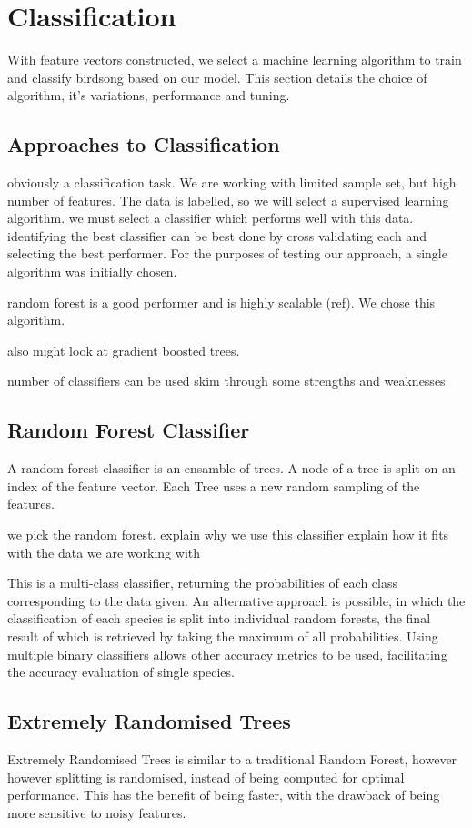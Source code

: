 \section{Classification}
With feature vectors constructed, we select a machine learning algorithm to
train and classify birdsong based on our model.
This section details the choice of algorithm, it's variations, performance and
tuning.

\subsection{Approaches to Classification}
obviously a classification task.
We are working with limited sample set, but high number of features.
The data is labelled, so we will select a supervised learning algorithm.
we must select a classifier which performs well with this data.
identifying the best classifier can be best done by cross validating each and
selecting the best performer.
For the purposes of testing our approach, a single algorithm was initially
chosen.

random forest is a good performer and is highly scalable (ref).
We chose this algorithm.

also might look at gradient boosted trees.

number of classifiers can be used
skim through some strengths and weaknesses

\subsection{Random Forest Classifier}
A random forest classifier is an ensamble of trees.
A node of a tree is split on an index of the feature vector.
Each Tree uses a new random sampling of the features.

we pick the random forest.
explain why we use this classifier
explain how it fits with the data we are working with

This is a multi-class classifier, returning the probabilities of each class
corresponding to the data given.
An alternative approach is possible, in which the classification of each species
is split into individual random forests, the final result of which is retrieved
by taking the maximum of all probabilities.
Using multiple binary classifiers allows other accuracy metrics to be used,
facilitating the accuracy evaluation of single species.

\subsection{Extremely Randomised Trees}
Extremely Randomised Trees is similar to a traditional Random Forest, however
however splitting is randomised, instead of being computed for optimal
performance.
This has the benefit of being faster, with the drawback of being more sensitive
to noisy features.\\


